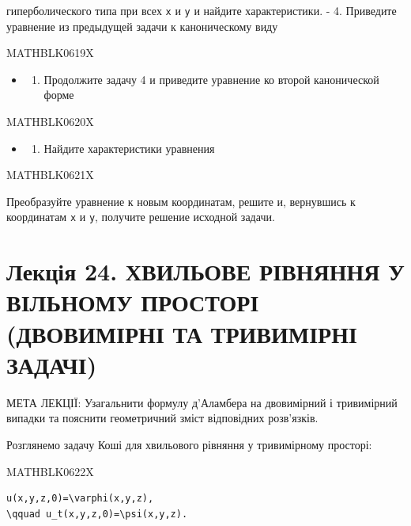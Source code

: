 \documentclass[
  ukrainian,
]{article}
\providecommand{\tightlist}{%
  \setlength{\itemsep}{0pt}\setlength{\parskip}{0pt}}
\begin{document}
гиперболического типа при всех \texttt{x} и \texttt{y} и найдите
характеристики. - 4. Приведите уравнение из предыдущей задачи к
каноническому виду

MATHBLK0619X

\begin{itemize}
\tightlist
\item
  \begin{enumerate}
  \def\labelenumi{\arabic{enumi}.}
  \setcounter{enumi}{4}
  \tightlist
  \item
    Продолжите задачу 4 и приведите уравнение ко второй канонической
    форме
  \end{enumerate}
\end{itemize}

MATHBLK0620X

\begin{itemize}
\tightlist
\item
  \begin{enumerate}
  \def\labelenumi{\arabic{enumi}.}
  \setcounter{enumi}{5}
  \tightlist
  \item
    Найдите характеристики уравнения
  \end{enumerate}
\end{itemize}

MATHBLK0621X

Преобразуйте уравнение к новым координатам, решите и, вернувшись к
координатам \texttt{x} и \texttt{y}, получите решение исходной задачи.

\section{Лекція 24. ХВИЛЬОВЕ РІВНЯННЯ У ВІЛЬНОМУ ПРОСТОРІ (ДВОВИМІРНІ ТА
ТРИВИМІРНІ
ЗАДАЧІ)}\label{ux43bux435ux43aux446ux456ux44f-24.-ux445ux432ux438ux43bux44cux43eux432ux435-ux440ux456ux432ux43dux44fux43dux43dux44f-ux443-ux432ux456ux43bux44cux43dux43eux43cux443-ux43fux440ux43eux441ux442ux43eux440ux456-ux434ux432ux43eux432ux438ux43cux456ux440ux43dux456-ux442ux430-ux442ux440ux438ux432ux438ux43cux456ux440ux43dux456-ux437ux430ux434ux430ux447ux456}

МЕТА ЛЕКЦІЇ: Узагальнити формулу д'Аламбера на двовимірний і тривимірний
випадки та пояснити геометричний зміст відповідних розв'язків.

Розглянемо задачу Коші для хвильового рівняння у тривимірному просторі:

MATHBLK0622X

\begin{verbatim}
u(x,y,z,0)=\varphi(x,y,z),
\qquad u_t(x,y,z,0)=\psi(x,y,z).
\end{verbatim}
\end{document}
